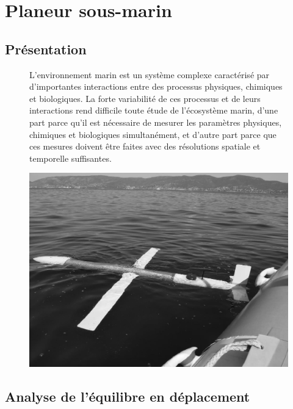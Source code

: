 

\section{Planeur sous-marin}

\subsection{Présentation}

\begin{figure}[!h]
 \begin{minipage}{0.6\linewidth}
L'environnement marin est un système complexe caractérisé par d'importantes interactions entre des processus physiques, chimiques et biologiques. La forte variabilité de ces processus et de leurs interactions rend difficile toute étude de l'écosystème marin, d'une part parce qu'il est nécessaire de mesurer les paramètres physiques, chimiques et biologiques simultanément, et d'autre part parce que ces mesures doivent être faites avec des résolutions spatiale et temporelle suffisantes.
 \end{minipage}
 \hfill
  \begin{minipage}{0.35\linewidth}
   \includegraphics[width=0.9\linewidth]{img/planeur.png}
  \end{minipage}
\end{figure}

\subsection{Analyse de l'équilibre en déplacement}

